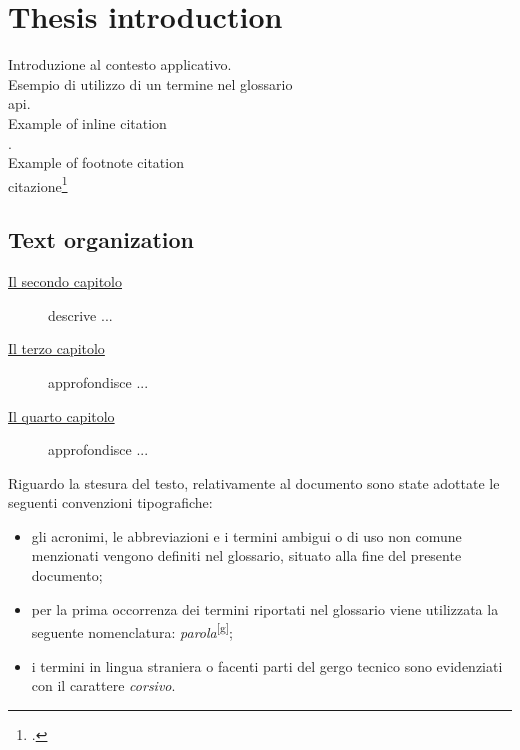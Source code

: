 
\chapter{Thesis introduction}
\label{cap:introduzione}

Introduzione al contesto applicativo.\\

\noindent Esempio di utilizzo di un termine nel glossario \\
\gls{api}. \\

\noindent Example of inline citation \\
\cite{site:agile-manifesto}. \\

\noindent Example of footnote citation  \\
citazione\footcite{womak:lean-thinking} \\

\section{Text organization}

\begin{description}
    \item[{\hyperref[cap:processi-metodologie]{Il secondo capitolo}}] descrive ...
    
    \item[{\hyperref[cap:descrizione-stage]{Il terzo capitolo}}] approfondisce ...
    
    \item[{\hyperref[cap:analisi-requisiti]{Il quarto capitolo}}] approfondisce ...
    
\end{description}

Riguardo la stesura del testo, relativamente al documento sono state adottate le seguenti convenzioni tipografiche:
\begin{itemize}
	\item gli acronimi, le abbreviazioni e i termini ambigui o di uso non comune menzionati vengono definiti nel glossario, situato alla fine del presente documento;
	\item per la prima occorrenza dei termini riportati nel glossario viene utilizzata la seguente nomenclatura: \emph{parola}\textsuperscript{[g]};
	\item i termini in lingua straniera o facenti parti del gergo tecnico sono evidenziati con il carattere \emph{corsivo}.
\end{itemize}

